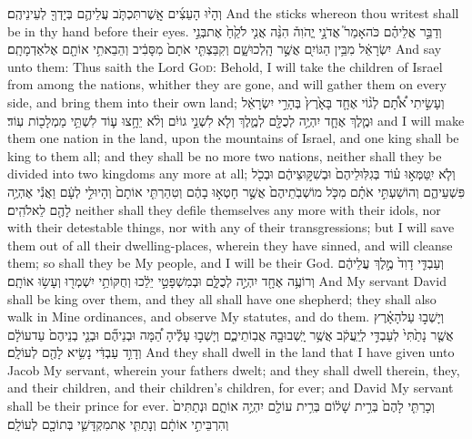 {וְהָי֨וּ הָעֵצִ֜ים אֲֽשֶׁר\maqqaf תִּכְתֹּ֧ב עֲלֵיהֶ֛ם בְּיָדְךָ֖ לְעֵינֵיהֶֽם׃}
{And the sticks whereon thou writest shall be in thy hand before their eyes.}
{וְדַבֵּ֣ר אֲלֵיהֶ֗ם כֹּה\maqqaf אָמַר֮ אֲדֹנָ֣י יֱהֹוִה֒ הִנֵּ֨ה אֲנִ֤י לֹקֵ֙חַ֙ אֶת\maqqaf בְּנֵ֣י יִשְׂרָאֵ֔ל מִבֵּ֥ין הַגּוֹיִ֖ם אֲשֶׁ֣ר הָֽלְכוּ\maqqaf שָׁ֑ם וְקִבַּצְתִּ֤י אֹתָם֙ מִסָּבִ֔יב וְהֵבֵאתִ֥י אוֹתָ֖ם אֶל\maqqaf אַדְמָתָֽם׃}
{And say unto them: Thus saith the Lord \textsc{God}: Behold, I will take the children of Israel from among the nations, whither they are gone, and will gather them on every side, and bring them into their own land;}
{וְעָשִׂ֣יתִי אֹ֠תָ֠ם לְג֨וֹי אֶחָ֤ד בָּאָ֙רֶץ֙ בְּהָרֵ֣י יִשְׂרָאֵ֔ל וּמֶ֧לֶךְ אֶחָ֛ד יִהְיֶ֥ה לְכֻלָּ֖ם לְמֶ֑לֶךְ וְלֹ֤א  לִשְׁנֵ֣י גוֹיִ֔ם וְלֹ֨א יֵחָ֥צוּ ע֛וֹד לִשְׁתֵּ֥י מַמְלָכ֖וֹת עֽוֹד׃}
{and I will make them one nation in the land, upon the mountains of Israel, and one king shall be king to them all; and they shall be no more two nations, neither shall they be divided into two kingdoms any more at all;}
{וְלֹ֧א יִֽטַּמְּא֣וּ ע֗וֹד בְּגִלּֽוּלֵיהֶם֙ וּבְשִׁקּ֣וּצֵיהֶ֔ם וּבְכֹ֖ל פִּשְׁעֵיהֶ֑ם וְהוֹשַׁעְתִּ֣י אֹתָ֗ם מִכֹּ֤ל מוֹשְׁבֹֽתֵיהֶם֙ אֲשֶׁ֣ר חָטְא֣וּ בָהֶ֔ם וְטִהַרְתִּ֤י אוֹתָם֙ וְהָיוּ\maqqaf לִ֣י לְעָ֔ם וַאֲנִ֕י אֶהְיֶ֥ה לָהֶ֖ם לֵאלֹהִֽים׃}
{neither shall they defile themselves any more with their idols, nor with their detestable things, nor with any of their transgressions; but I will save them out of all their dwelling-places, wherein they have sinned, and will cleanse them; so shall they be My people, and I will be their God.}
{וְעַבְדִּ֤י דָוִד֙ מֶ֣לֶךְ עֲלֵיהֶ֔ם וְרוֹעֶ֥ה אֶחָ֖ד יִהְיֶ֣ה לְכֻלָּ֑ם וּבְמִשְׁפָּטַ֣י יֵלֵ֔כוּ וְחֻקּוֹתַ֥י יִשְׁמְר֖וּ וְעָשׂ֥וּ אוֹתָֽם׃}
{And My servant David shall be king over them, and they all shall have one shepherd; they shall also walk in Mine ordinances, and observe My statutes, and do them.}
{וְיָשְׁב֣וּ עַל\maqqaf הָאָ֗רֶץ אֲשֶׁ֤ר נָתַ֙תִּי֙ לְעַבְדִּ֣י לְיַֽעֲקֹ֔ב אֲשֶׁ֥ר יָֽשְׁבוּ\maqqaf בָ֖הּ אֲבֽוֹתֵיכֶ֑ם וְיָשְׁב֣וּ עָלֶ֡יהָ הֵ֠מָּה וּבְנֵיהֶ֞ם וּבְנֵ֤י בְנֵיהֶם֙ עַד\maqqaf עוֹלָ֔ם וְדָוִ֣ד עַבְדִּ֔י נָשִׂ֥יא לָהֶ֖ם לְעוֹלָֽם׃}
{And they shall dwell in the land that I have given unto Jacob My servant, wherein your fathers dwelt; and they shall dwell therein, they, and their children, and their children’s children, for ever; and David My servant shall be their prince for ever.}
{וְכָרַתִּ֤י לָהֶם֙ בְּרִ֣ית שָׁל֔וֹם בְּרִ֥ית עוֹלָ֖ם יִהְיֶ֣ה אוֹתָ֑ם וּנְתַתִּים֙ וְהִרְבֵּיתִ֣י אוֹתָ֔ם וְנָתַתִּ֧י אֶת\maqqaf מִקְדָּשִׁ֛י בְּתוֹכָ֖ם לְעוֹלָֽם׃}
